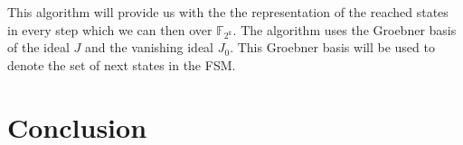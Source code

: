 \documentclass[12pt]{report}
\begin{document}
This algorithm will provide us with the the representation of the reached states in every step which we can then over $\mathbb{F}_{2^k}$. The algorithm uses the Groebner basis of the ideal $J$ and the vanishing ideal $J_0$. This Groebner basis will be used to denote the set of next states in the FSM. 

\section{Conclusion}




\end{document}
